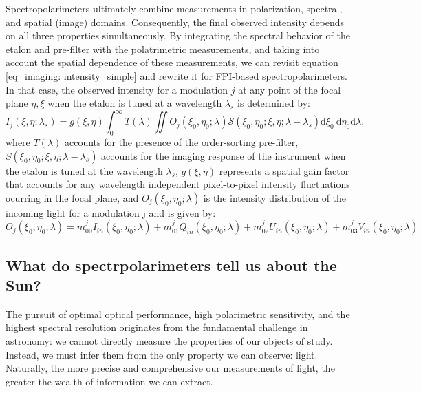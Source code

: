 Spectropolarimeters ultimately combine measurements in polarization, spectral, and spatial (image) domains. Consequently, the final observed intensity depends on all three properties simultaneously. By integrating the spectral behavior of the etalon and pre-filter with the polatrimetric measurements, and taking into account the spatial dependence of these measurements, we can revisit equation \eqref{eq_imaging: intensity_simple} and rewrite it for FPI-based spectropolarimeters. In that case, the observed intensity for a modulation $j$ at any point of the focal plane $\eta, \xi$ when the etalon is tuned at a wavelength $\lambda _ s$ is determined by:
\begin{equation}
  I_ j\left(\xi, \eta ; \lambda_{s}\right)=g(\xi, \eta)\int_{0}^{\infty} T(\lambda) \iint  O _ j\left(\xi_0, \eta_0 ; \lambda\right)  \mathcal{S}\left(\xi_0, \eta_0; \xi , \eta; \lambda-\lambda_{s}\right)  \mathrm{d} \xi_{0} \mathrm{~d} \eta_{0}\mathrm{d} \lambda ,
  \label{eq_spectro: General_Intensity}
\end{equation}
where $T(\lambda)$ accounts for the presence of the order-sorting pre-filter, $S\left(\xi_0, \eta_0; \xi , \eta; \lambda-\lambda_{s}\right)$ accounts for the imaging response of the instrument when the etalon is tuned at the wavelength $\lambda_{s}$, $g(\xi, \eta)$ represents a spatial gain factor that accounts for any wavelength independent pixel-to-pixel intensity fluctuations ocurring in the focal plane, and $O _ j(\xi_0, \eta_ 0;\lambda)$ is the intensity distribution of the incoming light for a modulation j and is given by:
\begin{equation}
  O _ j(\xi_0, \eta_ 0;\lambda) = m_{00} ^jI_{in}(\xi_0, \eta_ 0;\lambda) + m_{01}^jQ_{in}(\xi_0, \eta_ 0;\lambda) + m_{02}^jU_{in}(\xi_0, \eta_ 0;\lambda) + m_{03}^jV_{in}(\xi_0, \eta_ 0;\lambda)
\end{equation}
 
\subsection{What do spectrpolarimeters tell us about the Sun?}

The pursuit of optimal optical performance, high polarimetric sensitivity, and the highest spectral resolution originates from the fundamental challenge in astronomy: we cannot directly measure the properties of our objects of study. Instead, we must infer them from the only property we can observe: light. Naturally, the more precise and comprehensive our measurements of light, the greater the wealth of information we can extract. 

